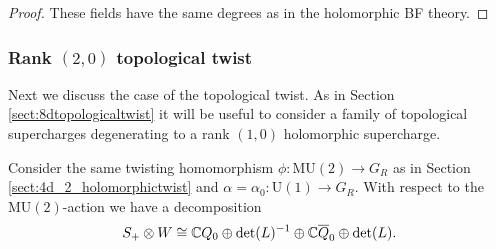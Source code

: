 \documentclass[10pt, oneside]{article}
\newcommand{\MU}{\mathrm{MU}}
\renewcommand{\U}{\mathrm{U}}
\begin{document}
\begin{proof}
These fields have the same degrees as in the holomorphic BF theory.

\begin{comment}
and hence the underlying local $L_\infty$ algebra after the twist becomes

\[
\xymatrix@R=0.5cm@C=0.5cm{
\ul{0} & \ul{1} & \ul{2} & \ul{3} & \\ 
\Omega^0(\CC^2; \gg)_c \ar[r] &\Omega^{0,1}(\CC^2; \gg)_{A_{0,1}} \ar[r] &\Omega^{0,2}(\CC^2; \gg)_{B} \\
  & \Omega^{2,0}(\CC^2 ; \gg)_{B^*} \ar[r] & \Omega^{2,1}(\CC^2 ; \gg)_{A_{0,1}^*} \ar[r] & \Omega^{2,2}(\CC^2 ; \gg)_{c^*} \\
  }
\]

\[
\xymatrix@R=0.5cm@C=0.5cm{
\ul{-4n+2} & \ul{-4n+3} & \ul{-4n+4} & \cdots & \ul{4n-1} & \ul{4n} & \ul{4n+1} \\ 
 &&&& \Omega^0(\CC^2; \gg)_a \ar[r] &\Omega^{0,1}(\CC^2; \gg)_{b} \ar[r] &\Omega^{0,2}(\CC^2; \gg)_{\xi^*} \\
 \Omega^{2,0}(\CC^2; \gg)_\xi \ar[r] &\Omega^{2,1}(\CC^2; \gg)_{b^*} \ar[r] &\Omega^{2,2}(\CC^2; \gg)_{a^*}  \\
}
\]

\[
\xymatrix@R=0.5cm@C=0.5cm{
\ul{-2n+1} & \ul{-2n+2} & \ul{-2n+3} & \cdots & \ul{2n} & \ul{2n+1} & \ul{2n+2} \\ 
\Omega^0(\CC^2 ; U)_\phi \ar[r] & \Omega^{0,1}(\CC^2 ; U)_\psi \ar[r] & \Omega^{0,2}(\CC^2 ; U)_{\varphi^*} \\
& & & & \Omega^{2,0}(\CC^2 ; U)_{\varphi} \ar[r] & \Omega^{2,1}(\CC^2 ; U)_{\psi^*} \ar[r] & \Omega^{2,2}(\CC^2 ; U)_{\phi^*}
}
\]
\end{comment}
\end{proof}

\subsubsection{Rank \texorpdfstring{$(2,0)$}{(2,0)} topological twist}
\label{sect:4d2Donaldson}

Next we discuss the case of the topological twist. As in Section \ref{sect:8dtopologicaltwist} it will be useful to consider a family of topological supercharges degenerating to a rank $(1, 0)$ holomorphic supercharge.

Consider the same twisting homomorphism $\phi\colon \MU(2)\rightarrow G_R$ as in Section \ref{sect:4d_2_holomorphictwist} and $\alpha=\alpha_0\colon \U(1)\rightarrow G_R$. With respect to the $\MU(2)$-action we have a decomposition
\[S_+\otimes W\cong \mathbb C Q_0 \oplus \det(L)^{-1}\oplus \mathbb C \overline{Q}_0\oplus \det(L).\]
\end{document}
